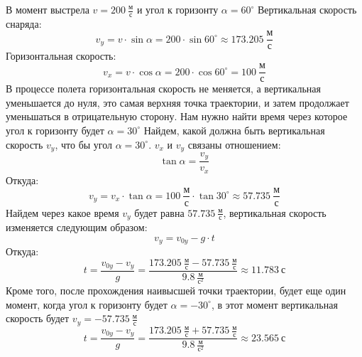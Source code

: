 \documentclass{minimal}
\begin{document}
    \noindent
    В момент выстрела $v=200~\frac{\text{м}}{\text{с}}$ и угол к горизонту $\alpha=60^{\circ}$ Вертикальная скорость снаряда:
    \[
        v_y=v \cdot \sin{\alpha}=200 \cdot \sin{60^{\circ}}\approx173.205~\frac{\text{м}}{\text{с}}
    \]
    Горизонтальная скорость:
    \[
        v_x=v \cdot \cos{\alpha}=200 \cdot \cos{60^{\circ}}=100~\frac{\text{м}}{\text{с}} 
    \]
    В процессе полета горизонтальная скорость не меняется, а вертикальная уменьшается до нуля, это самая верхняя точка траектории, и затем продолжает уменьшаться в отрицательную сторону.
    Нам нужно найти время через которое угол к горизонту будет $\alpha=30^{\circ}$ Найдем, какой должна быть вертикальная скорость $v_y$, что бы угол $\alpha=30^{\circ}$. $v_x$ и $v_y$ связаны отношением:
    \[
        \tan{\alpha}=\frac{v_y}{v_x}
    \]
    Откуда:
    \[
        v_y=v_x \cdot \tan{\alpha}=100~\frac{\text{м}}{\text{с}} \cdot \tan{30^{\circ}} \approx 57.735~\frac{\text{м}}{\text{с}}
    \]
    Найдем через какое время $v_y$ будет равна $57.735~\frac{\text{м}}{\text{с}}$, вертикальная скорость изменяется следующим образом:
    \[
        v_y=v_{0y} - g \cdot t
    \]
    Откуда:
    \[
        t = \frac{v_{0y} - v_y}{g}=\frac{173.205~\frac{\text{м}}{\text{с}} - 57.735~\frac{\text{м}}{\text{с}}}{9.8~\frac{\text{м}}{\text{с}^2}} \approx 11.783~\text{с}
    \]
    Кроме того, после прохождения наивысшей точки траектории, будет еще один момент, когда угол к горизонту будет $\alpha=-30^{\circ}$, в этот момент вертикальная скорость будет $v_y=-57.735~\frac{\text{м}}{\text{с}}$
    \[
        t = \frac{v_{0y} - v_y}{g}=\frac{173.205~\frac{\text{м}}{\text{с}} + 57.735~\frac{\text{м}}{\text{с}}}{9.8~\frac{\text{м}}{\text{с}^2}} \approx 23.565~\text{с}
    \]
\end{document}
